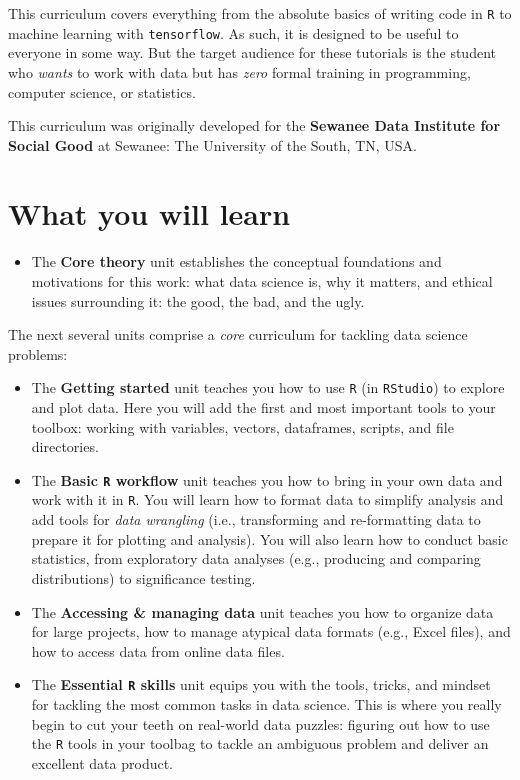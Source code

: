 \documentclass[
]{book}
\providecommand{\tightlist}{%
  \setlength{\itemsep}{0pt}\setlength{\parskip}{0pt}}
\begin{document}
This curriculum covers everything from the absolute basics of writing code in \texttt{R} to machine learning with \texttt{tensorflow}. As such, it is designed to be useful to everyone in some way. But the target audience for these tutorials is the student who \emph{wants} to work with data but has \emph{zero} formal training in programming, computer science, or statistics.

This curriculum was originally developed for the \textbf{Sewanee Data Institute for Social Good} at Sewanee: The University of the South, TN, USA.

\hypertarget{what-you-will-learn}{%
\section*{What you will learn}\label{what-you-will-learn}}

\begin{itemize}
\tightlist
\item
  The \textbf{Core theory} unit establishes the conceptual foundations and motivations for this work: what data science is, why it matters, and ethical issues surrounding it: the good, the bad, and the ugly.
\end{itemize}

The next several units comprise a \emph{core} curriculum for tackling data science problems:

\begin{itemize}
\item
  The \textbf{Getting started} unit teaches you how to use \texttt{R} (in \texttt{RStudio}) to explore and plot data. Here you will add the first and most important tools to your toolbox: working with variables, vectors, dataframes, scripts, and file directories.
\item
  The \textbf{Basic \texttt{R} workflow} unit teaches you how to bring in your own data and work with it in \texttt{R}. You will learn how to format data to simplify analysis and add tools for \emph{data wrangling} (i.e., transforming and re-formatting data to prepare it for plotting and analysis). You will also learn how to conduct basic statistics, from exploratory data analyses (e.g., producing and comparing distributions) to significance testing.
\item
  The \textbf{Accessing \& managing data} unit teaches you how to organize data for large projects, how to manage atypical data formats (e.g., Excel files), and how to access data from online data files.
\item
  The \textbf{Essential \texttt{R} skills} unit equips you with the tools, tricks, and mindset for tackling the most common tasks in data science. This is where you really begin to cut your teeth on real-world data puzzles: figuring out how to use the \texttt{R} tools in your toolbag to tackle an ambiguous problem and deliver an excellent data product.
\end{itemize}
\end{document}
